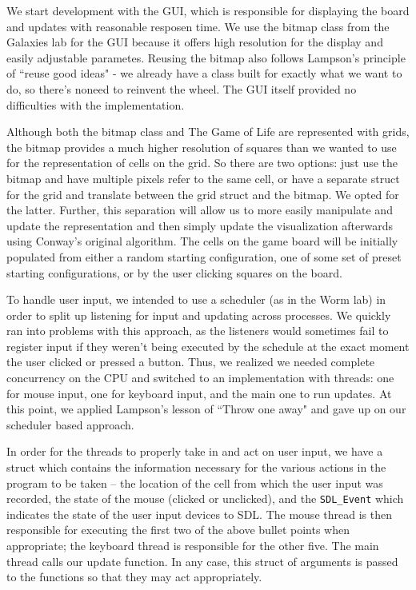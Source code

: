 \documentclass[onecolumn,12pt]{IEEEtran}
\begin{document}
  We start development with the GUI, which is responsible for displaying the
  board and updates with reasonable resposen time. We use the bitmap class from
  the Galaxies lab for the GUI because it offers high resolution for the display
  and easily adjustable parametes. Reusing the bitmap also follows Lampson's
  principle of ``reuse good ideas" - we already have a class built for exactly
  what we want to do, so there's noneed to reinvent the wheel. The GUI itself
  provided no difficulties with the implementation. 

  Although both the bitmap class and The Game of Life are represented with grids,
  the bitmap provides a much higher resolution of squares than we wanted to use
  for the representation of cells on the grid. So there are two options: just use
  the bitmap and have multiple pixels refer to the same cell, or have a separate
  struct for the grid and translate between the grid struct and the bitmap. We
  opted for the latter. Further, this separation will allow us to more easily
  manipulate and update the representation and then simply update the
  visualization afterwards using Conway's original algorithm. The cells on the
  game board will be initially populated from either a random starting
  configuration, one of some set of preset starting configurations, or by the
  user clicking squares on the board. 

  To handle user input, we intended to use a scheduler (as in the Worm lab) in
  order to split up listening for input and updating across processes. We quickly
  ran into problems with this approach, as the listeners would sometimes fail to
  register input if they weren't being executed by the schedule at the exact
  moment the user clicked or pressed a button. Thus, we realized we needed
  complete concurrency on the CPU and switched to an implementation with threads:
  one for mouse input, one for keyboard input, and the main one to run updates.
  At this point, we applied Lampson's lesson of ``Throw one away" and gave up on
  our scheduler based approach.

  In order for the threads to properly take in and act on user input, we have a
  struct which contains the information necessary for the various actions in the
  program to be taken -- the location of the cell from which the user input was
  recorded, the state of the mouse (clicked or unclicked), and the
  \texttt{SDL\_Event} which indicates the state of the user input devices to SDL.
  The mouse thread is then responsible for executing the first two of the above
  bullet points when appropriate; the keyboard thread is responsible for the
  other five. The main thread calls our update function. In any case, this struct
  of arguments is passed to the functions so that they may act appropriately. 
\end{document}
